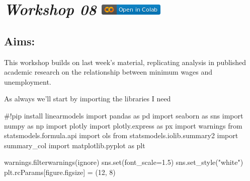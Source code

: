 \documentclass[
  letterpaper,
  DIV=11,
  numbers=noendperiod]{scrreprt}
\newenvironment{Shaded}{\begin{snugshade}}{\end{snugshade}}
\newcommand{\BuiltInTok}[1]{\textcolor[rgb]{0.00,0.23,0.31}{#1}}
\newcommand{\CommentTok}[1]{\textcolor[rgb]{0.37,0.37,0.37}{#1}}
\newcommand{\DecValTok}[1]{\textcolor[rgb]{0.68,0.00,0.00}{#1}}
\newcommand{\FloatTok}[1]{\textcolor[rgb]{0.68,0.00,0.00}{#1}}
\newcommand{\ImportTok}[1]{\textcolor[rgb]{0.00,0.46,0.62}{#1}}
\newcommand{\NormalTok}[1]{\textcolor[rgb]{0.00,0.23,0.31}{#1}}
\newcommand{\OperatorTok}[1]{\textcolor[rgb]{0.37,0.37,0.37}{#1}}
\newcommand{\StringTok}[1]{\textcolor[rgb]{0.13,0.47,0.30}{#1}}
\begin{document}
\hypertarget{workshop-08-open-in-colab}{%
\section[\emph{Workshop 08} ]{\texorpdfstring{\emph{Workshop 08}
\href{https://colab.research.google.com/github/oballinger/QM2/blob/main/notebooks/W08.\%20Diff-in-Diff.ipynb}{\protect\includegraphics{index_files/mediabag/colab-badge.png}}}{Workshop 08 Open In Colab}}\label{workshop-08-open-in-colab}}

\hypertarget{aims-6}{%
\subsection{Aims:}\label{aims-6}}

This workshop builds on last week's material, replicating analysis in
published academic research on the relationship between minimum wages
and unemployment.

As always we'll start by importing the libraries I need

\begin{Shaded}
\begin{Highlighting}[]
\CommentTok{\#!pip install linearmodels}
\ImportTok{import}\NormalTok{ pandas }\ImportTok{as}\NormalTok{ pd}
\ImportTok{import}\NormalTok{ seaborn }\ImportTok{as}\NormalTok{ sns}
\ImportTok{import}\NormalTok{ numpy }\ImportTok{as}\NormalTok{ np}
\ImportTok{import}\NormalTok{ plotly}
\ImportTok{import}\NormalTok{ plotly.express }\ImportTok{as}\NormalTok{ px}
\ImportTok{import}\NormalTok{ warnings}
\ImportTok{from}\NormalTok{ statsmodels.formula.api }\ImportTok{import}\NormalTok{ ols}
\ImportTok{from}\NormalTok{ statsmodels.iolib.summary2 }\ImportTok{import}\NormalTok{ summary\_col}
\ImportTok{import}\NormalTok{ matplotlib.pyplot }\ImportTok{as}\NormalTok{ plt}

\NormalTok{warnings.filterwarnings(}\StringTok{\textquotesingle{}ignore\textquotesingle{}}\NormalTok{)}
\NormalTok{sns.}\BuiltInTok{set}\NormalTok{(font\_scale}\OperatorTok{=}\FloatTok{1.5}\NormalTok{)}
\NormalTok{sns.set\_style(}\StringTok{"white"}\NormalTok{)}
\NormalTok{plt.rcParams[}\StringTok{\textquotesingle{}figure.figsize\textquotesingle{}}\NormalTok{] }\OperatorTok{=}\NormalTok{ (}\DecValTok{12}\NormalTok{, }\DecValTok{8}\NormalTok{)}
\end{Highlighting}
\end{Shaded}
\end{document}
